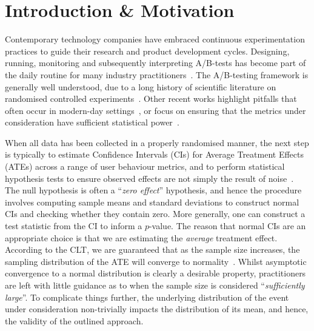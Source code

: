 \section{Introduction \& Motivation}
Contemporary technology companies have embraced continuous experimentation practices to guide their research and product development cycles.
Designing, running, monitoring and subsequently interpreting A/B-tests has become part of the daily routine for many industry practitioners~\cite{kohavi2020trustworthy, Larsen2024}.
The A/B-testing framework is generally well understood, due to a long history of scientific literature on randomised controlled experiments~\cite{Fisher1921,Rubin1974}.
Other recent works highlight pitfalls that often occur in modern-day settings~\cite{Kohavi2022, Dmitriev2017,Jeunen2023_Forum, Kohavi2024}, or focus on ensuring that the metrics under consideration have sufficient statistical power~\cite{Baweja2024,Jeunen2024_Learning,Jeunen2024_RecSysIndustry,Tripuraneni2024, Deng2024, Guo2021}.

When all data has been collected in a properly randomised manner, the next step is typically to estimate Confidence Intervals (CIs) for Average Treatment Effects (ATEs) across a range of user behaviour metrics, and to perform statistical hypothesis tests to ensure observed effects are not simply the result of noise~\cite{Greenland2016}.
The null hypothesis is often a ``\emph{zero effect}'' hypothesis, and hence the procedure involves computing sample means and standard deviations to construct normal CIs and checking whether they contain zero.
More generally, one can construct a test statistic from the CI to inform a $p$-value.
The reason that normal CIs are an appropriate choice is that we are estimating the \emph{average} treatment effect.
According to the CLT, we are guaranteed that as the sample size increases, the sampling distribution of the ATE will converge to normality~\cite{Durret2019, Fischer2010}.
Whilst asymptotic convergence to a normal distribution is clearly a desirable property, practitioners are left with little guidance as to when the sample size is considered ``\emph{sufficiently large}''.
To complicate things further, the underlying distribution of the event under consideration non-trivially impacts the distribution of its mean, and hence, the validity of the outlined approach.

